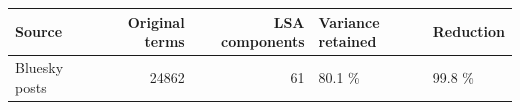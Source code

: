\begin{tabular}{lrrll}
\toprule
Source & Original terms & LSA components & Variance retained & Reduction \\
\midrule
Bluesky posts & 24862 & 61 & 80.1 \% & 99.8 \% \\
\bottomrule
\end{tabular}
